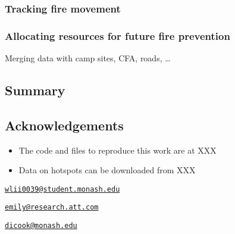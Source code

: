 \hypertarget{tracking-fire-movement}{%
\subsubsection{Tracking fire movement}\label{tracking-fire-movement}}

\hypertarget{allocating-resources-for-future-fire-prevention}{%
\subsubsection{Allocating resources for future fire
prevention}\label{allocating-resources-for-future-fire-prevention}}

Merging data with camp sites, CFA, roads, \ldots{}

\hypertarget{summary}{%
\subsection{Summary}\label{summary}}

\hypertarget{acknowledgements}{%
\subsection{Acknowledgements}\label{acknowledgements}}

\begin{itemize}
\tightlist
\item
  The code and files to reproduce this work are at XXX
\item
  Data on hotspots can be downloaded from XXX
\end{itemize}




\address{%
Weihao Li\\
Monash University\\
line 1\\ line 2\\
}
\href{mailto:wlii0039@student.monash.edu}{\nolinkurl{wlii0039@student.monash.edu}}

\address{%
Emily Dodwell\\
AT\&T\\
line 1\\ line 2\\
}
\href{mailto:emily@research.att.com}{\nolinkurl{emily@research.att.com}}

\address{%
Dianne Cook\\
Monash University\\
line 1\\ line 2\\
}
\href{mailto:dicook@monash.edu}{\nolinkurl{dicook@monash.edu}}

